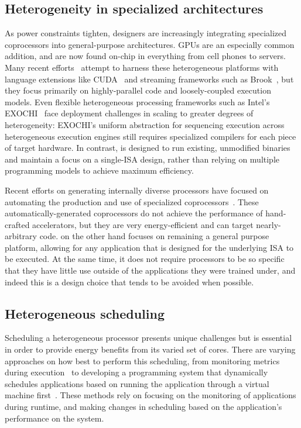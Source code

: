 \subsection{Heterogeneity in specialized architectures}
As power constraints tighten, designers are increasingly integrating
specialized coprocessors into general-purpose architectures.  GPUs are
an especially common addition, and are now found on-chip in everything
from cell phones to servers. Many recent
efforts~\cite{Kim09-MICRO-Qilin} attempt to harness these
heterogeneous platforms with language extensions like
CUDA~\cite{scalableCUDA} and streaming frameworks such as
Brook~\cite{brook}, but they focus primarily on highly-parallel code
and loosely-coupled execution models. Even flexible heterogeneous
processing frameworks such as Intel's EXOCHI~\cite{EXOCHI} face
deployment challenges in scaling to greater degrees of heterogeneity:
EXOCHI's uniform abstraction for sequencing execution across
heterogeneous execution engines still requires specialized compilers
for each piece of target hardware. In contrast, \Ravan{} is designed
to run existing, unmodified binaries and maintain a focus on a single-ISA
design, rather than relying on multiple programming models to achieve
maximum efficiency.

Recent efforts on generating internally diverse processors have
focused on automating the production and use of specialized
coprocessors~\cite{Venkatesh10-ASPLOS-CCores,sampson-HPCA-ECOCORES}.  These
automatically-generated coprocessors do not achieve the performance of
hand-crafted accelerators, but they are very energy-efficient and can
target nearly-arbitrary code. \Ravan{} on the other hand focuses on
remaining a general purpose platform, allowing for any application that is 
designed for the underlying ISA to be executed. At the same time, it does not 
require processors to be so specific that they have little use outside of 
the applications they were trained under, and indeed this is a design choice
that tends to be avoided when possible.

\subsection{Heterogeneous scheduling}
Scheduling a heterogeneous processor presents unique challenges but is
essential in order to provide energy benefits from its varied set of cores. 
There are varying approaches on how best to perform this scheduling, from monitoring metrics
during execution~\cite{PIE} to developing a programming system that dynamically
schedules applications based on running the application through a virtual machine 
first~\cite{Kim09-MICRO-Qilin}. These methods rely on focusing on the monitoring of
applications during runtime, and making changes in scheduling based on
the application's performance on the system.

